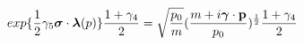 \begin{equation}
exp\{ \frac{1}{2} \gamma_{5} \mbox{\boldmath $\sigma$} \cdot \mbox{\boldmath 
$\lambda$}(p)\}
\frac{1+\gamma_{4}}{2} = \sqrt{\frac{p_{0}}{m}} (\frac{m+i \mbox{\boldmath $\gamma$} 
\cdot {\bf p}}{p_{0}})^{\frac{1}{2}} \frac{1+\gamma_{4}}{2}     \label{eq:exp}
\end{equation}

